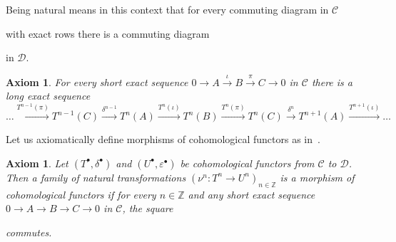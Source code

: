 \documentclass[12pt, a4paper]{article}
\numberwithin{equation}{section}
\newtheorem{axm}[thm]{Axiom}
\theoremstyle{empty}
\theoremstyle{nonumberplain}
\begin{document}
Being natural means in this context that for every commuting diagram in $\mathcal{C}$
\begin{center}
\end{center}
with exact rows there is a commuting diagram
\begin{center}
\end{center}
in $\mathcal{D}$.

\begin{axm}\label{axm:les}
For every short exact sequence $0 \rightarrow A \xrightarrow{\iota} B \xrightarrow{\pi} C \rightarrow 0$ in $\mathcal{C}$ there is a long exact sequence
\[ \dots {} \xrightarrow{T^{n-1}(\pi)} T^{n-1}(C) \xrightarrow{\delta^{n-1}} T^n(A) \xrightarrow{T^n(\iota)} T^n(B) \xrightarrow{T^n(\pi)} T^n(C) \xrightarrow{\delta^n} T^{n+1}(A) \xrightarrow{T^{n+1}(\iota)} {} \dots \]
\end{axm}

Let us axiomatically define morphisms of cohomological functors as in~\cite[p.~202]{kro95}.

\begin{axm}\label{axm:morphisms}
Let $(T^{\bullet}, \delta^{\bullet})$ and $(U^{\bullet},\varepsilon^{\bullet})$ be cohomological functors from $\mathcal{C}$ to $\mathcal{D}$. Then a family of natural transformations $(\nu^n: T^n \rightarrow U^n)_{n \in \mathbb{Z}}$ is a morphism of cohomological functors if for every $n \in \mathbb{Z}$ and any short exact sequence $0 \rightarrow A \rightarrow B \rightarrow C \rightarrow 0$ in $\mathcal{C}$, the square
\begin{center}
\end{center}
commutes.
\end{axm}
\end{document}
